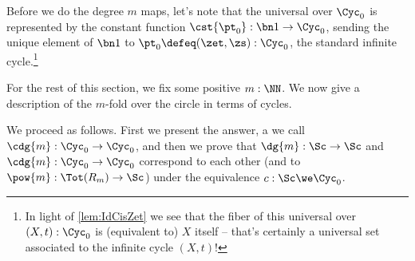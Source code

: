 Before we do the degree $m$ maps, let's note that the
universal \covering over $\Cyc_0$ is represented by the constant function
$\cst{\pt_0}:\bn 1\to\Cyc_0$, sending the unique element
of $\bn 1$ to $\pt_0\defeq(\zet,\zs):\Cyc_0$, the standard infinite cycle.\footnote{%
  In light of \cref{lem:IdCisZet} we see that the fiber
  of this universal \covering over $(X,t):\Cyc_0$ is (equivalent to) $X$ itself
  -- that's certainly a universal set associated to the
  infinite cycle $(X,t)$!}

For the rest of this section, we fix some positive $m:\NN$.
We now give a description of
the $m$-fold \covering over the circle in terms of cycles.

We proceed as follows.
First we present the answer, a \covering we call $\cdg{m}:\Cyc_0\to\Cyc_0$,
and then we prove that $\dg{m}:\Sc\to\Sc$ and $\cdg{m}:\Cyc_0\to\Cyc_0$
correspond to each other (and to $\pow{m}:\Tot(R_m)\to\Sc$)
under the equivalence $c:\Sc\we\Cyc_0$.

